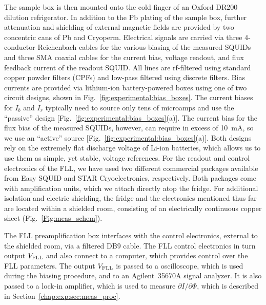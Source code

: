 The sample box is then mounted onto the cold finger of an Oxford DR200 dilution refrigerator. In addition to the Pb plating of the sample box, further attenuation and shielding of external magnetic fields are provided by two concentric cans of Pb and Cryoperm. Electrical signals are carried via three 4-conductor Reichenbach cables for the various biasing of the measured SQUIDs and three SMA coaxial cables for the current bias, voltage readout, and flux feedback current of the readout SQUID. All lines are rf-filtered using standard copper powder filters (CPFs) and low-pass filtered using discrete filters. Bias currents are provided via lithium-ion battery-powered boxes using one of two circuit designs, shown in Fig.~\ref{fig:experimental:bias_boxes}. The current biases for $I_b$ and $I_r$ typically need to source only tens of microamps and use the ``passive'' design  [Fig.~\ref{fig:experimental:bias_boxes}(a)]. The current bias for the flux bias of the measured SQUIDs, however, can require in excess of 10~mA, so we use an ``active'' source [Fig.~\ref{fig:experimental:bias_boxes}(a)]. Both designs rely on the extremely flat discharge voltage of Li-ion batteries, which allows us to use them as simple, yet stable, voltage references. For the readout and control electronics of the FLL, we have used two different commercial packages available from Easy SQUID and STAR Cryoelectronics, respectively. Both packages come with amplification units, which we attach directly atop the fridge. For additional isolation and electric shielding, the fridge and the electronics mentioned thus far are located within a shielded room, consisting of an electrically continuous copper sheet (Fig.~\ref{Fig:meas_schem}).

The FLL preamplification box interfaces with the control electronics, external to the shielded room, via a filtered DB9 cable. The FLL control electronics in turn output $V_\text{FLL}$ and also connect to a computer, which provides control over the FLL parameters. The output $V_\text{FLL}$ is passed to a oscilloscope, which is used during the biasing procedure, and to an Agilent~35670A signal analyzer. It is also passed to a lock-in amplifier, which is used to measure $\partial I/\partial \Phi$, which is described in Section~\ref{chap:exp:sec:meas_proc}.

